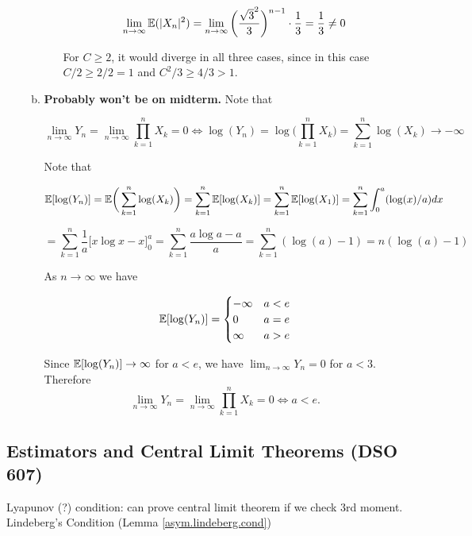 \begin{enumerate}[(1)]
\begin{enumerate}[(a)]
\begin{enumerate}[(i)]
\[
\lim_{n \to \infty} \mathbb{E}(|X_n|^2) = \lim_{n \to \infty} \bigg( \frac{\sqrt{3}^2}{3}\bigg)^{n-1} \cdot \frac{1}{3} = \frac{1}{3} \neq 0
\]

For \(C \geq 2\), it would diverge in all three cases, since in this case \(C/2 \geq 2/2 = 1\) and \(C^2/3 \geq 4/3 > 1\).

\end{enumerate}

\item \textbf{Probably won't be on midterm.} Note that 

\[
\lim_{n \to \infty} Y_n = \lim_{n \to \infty} \prod_{k=1}^n X_k = 0 \iff \log(Y_n) = \log \bigg( \prod_{k=1}^n X_k\bigg) = \sum_{k=1}^n \log (X_k) \to -\infty
\]

Note that

\[
\mathbb{E}[ \log(Y_n)] = \mathbb{E} \bigg(  \sum_{k=1}^n \log (X_k) \bigg) = \sum_{k=1}^n \mathbb{E}[\log(X_k)] = \sum_{k=1}^n \mathbb{E}[\log(X_1)] = \sum_{k=1}^n \int_0^a ( \log(x) /a) dx
\]

\[
=  \sum_{k=1}^n \frac{1}{a} \big[x \log x - x \big]_0^a =  \sum_{k=1}^n \frac{a \log a - a}{a} =  \sum_{k=1}^n ( \log(a) - 1) =n(\log(a) - 1)
\]

As \(n \to \infty\) we have

\[
\mathbb{E}[ \log(Y_n)]  = \begin{cases}
-\infty & a < e \\ 
0 & a = e \\ 
\infty & a > e 
\end{cases}
\]

Since \(\mathbb{E}[ \log(Y_n)] \to \infty\) for \(a < e\), we have \(\lim_{n \to \infty} Y_n = 0\) for \(a < 3\). Therefore \[\boxed{\lim_{n \to \infty}Y_n = \lim_{n \to \infty} \prod_{k=1}^n X_k = 0 \iff a < e.}\]


\end{enumerate}

\end{enumerate}

\subsection{Estimators and Central Limit Theorems (DSO 607)}

Lyapunov (?) condition: can prove central limit theorem if we check 3rd moment. Lindeberg's Condition (Lemma \ref{asym.lindeberg.cond})

%
%
%
%
%
%
%
%

%
%
%